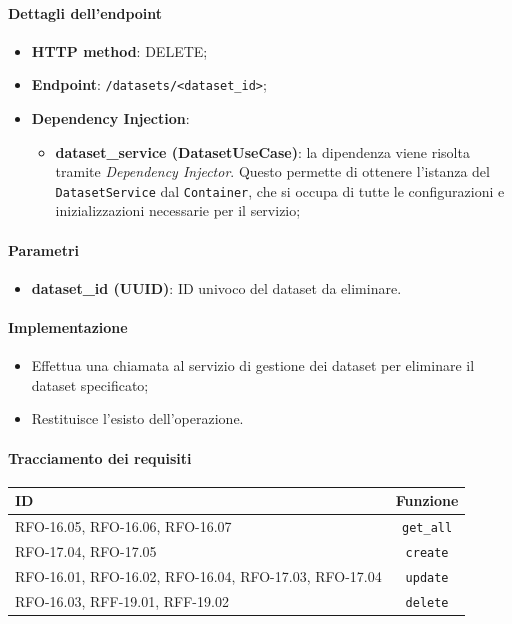 \paragraph{Dettagli dell'endpoint}
\begin{itemize}
    \item \textbf{HTTP method}: DELETE;
    \item \textbf{Endpoint}: \texttt{/datasets/<dataset\_id>};
    \item \textbf{Dependency Injection}: 
    \begin{itemize}
        \item \textbf{dataset\_service (DatasetUseCase)}: la dipendenza viene risolta tramite \textit{Dependency Injector}. Questo permette di ottenere l'istanza del \texttt{DatasetService} dal \texttt{Container}, che si occupa di tutte le configurazioni e inizializzazioni necessarie per il servizio;
    \end{itemize}
\end{itemize}

\paragraph{Parametri}
\begin{itemize}
    \item \textbf{dataset\_id (UUID)}: ID univoco del dataset da eliminare.
\end{itemize}

\paragraph{Implementazione}
\begin{itemize}
    \item Effettua una chiamata al servizio di gestione dei dataset per eliminare il dataset specificato;
    \item Restituisce l'esisto dell'operazione.
\end{itemize}

\paragraph{Tracciamento dei requisiti}
\begin{tabularx}{\textwidth}{|X|c|}
    \hline
    \textbf{ID} & \textbf{Funzione} \\
    \hline
        RFO-16.05, RFO-16.06, RFO-16.07 & \texttt{get\_all}\\
    \hline
        RFO-17.04, RFO-17.05 & \texttt{create}\\
    \hline
        RFO-16.01, RFO-16.02, RFO-16.04, RFO-17.03, RFO-17.04 & \texttt{update}\\
    \hline
        RFO-16.03, RFF-19.01, RFF-19.02 & \texttt{delete}\\
    \hline
\end{tabularx}